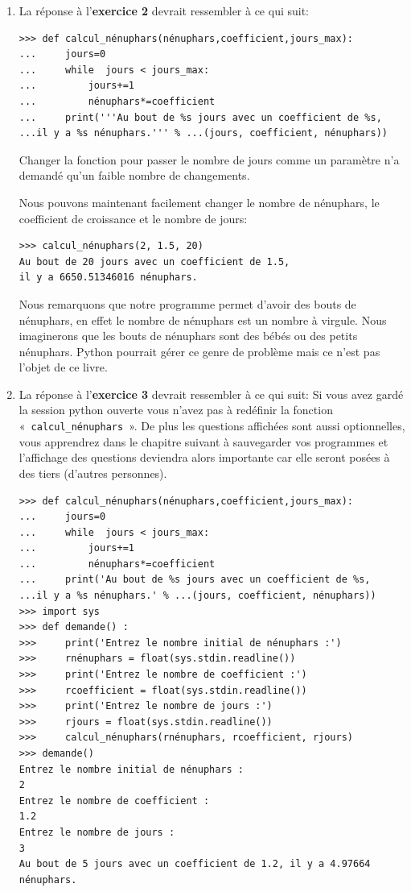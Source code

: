 \begin{enumerate}
\item La réponse à l'\textbf{exercice 2} devrait ressembler à ce qui suit: 
\begin{Verbatim}[frame=single,rulecolor=\color{mbleu}, label=à taper]
>>> def calcul_nénuphars(nénuphars,coefficient,jours_max):
...     jours=0
...     while  jours < jours_max:
...         jours+=1
...         nénuphars*=coefficient
...     print('''Au bout de %s jours avec un coefficient de %s, 
...il y a %s nénuphars.''' % ...(jours, coefficient, nénuphars))
\end{Verbatim}
Changer la fonction pour passer le nombre de jours comme un paramètre n'a demandé qu'un faible nombre de changements.

Nous pouvons maintenant facilement changer le nombre de nénuphars, le coefficient de croissance et le nombre de jours:

\begin{Verbatim}[frame=single,rulecolor=\color{mbleu}, label=à taper]
>>> calcul_nénuphars(2, 1.5, 20)
Au bout de 20 jours avec un coefficient de 1.5, 
il y a 6650.51346016 nénuphars.
\end{Verbatim}
Nous remarquons que notre programme permet d'avoir des bouts de nénuphars, en effet le nombre de nénuphars est un nombre à virgule. Nous imaginerons que les bouts de nénuphars sont des bébés ou des petits nénuphars. Python pourrait gérer ce genre de problème mais ce n'est pas l'objet de ce livre.

\item La réponse à l'\textbf{exercice 3} devrait ressembler à ce qui suit: 
Si vous avez gardé la session python ouverte vous n'avez pas à redéfinir la fonction «~\texttt{calcul\_nénuphars}~». De plus les questions affichées sont aussi optionnelles, vous apprendrez dans le chapitre suivant à sauvegarder vos programmes et l'affichage des questions deviendra alors importante car elle seront posées à des tiers (d'autres personnes).

\begin{Verbatim}[frame=single,rulecolor=\color{mbleu}, label=à taper]
>>> def calcul_nénuphars(nénuphars,coefficient,jours_max):
...     jours=0
...     while  jours < jours_max:
...         jours+=1
...         nénuphars*=coefficient
...     print('Au bout de %s jours avec un coefficient de %s, 
...il y a %s nénuphars.' % ...(jours, coefficient, nénuphars))
>>> import sys
>>> def demande() : 
>>>     print('Entrez le nombre initial de nénuphars :')
>>>     rnénuphars = float(sys.stdin.readline())
>>>     print('Entrez le nombre de coefficient :')
>>>     rcoefficient = float(sys.stdin.readline())
>>>     print('Entrez le nombre de jours :')
>>>     rjours = float(sys.stdin.readline())
>>>     calcul_nénuphars(rnénuphars, rcoefficient, rjours)
>>> demande()
Entrez le nombre initial de nénuphars :
2
Entrez le nombre de coefficient :
1.2
Entrez le nombre de jours :
3
Au bout de 5 jours avec un coefficient de 1.2, il y a 4.97664 nénuphars.\end{Verbatim}
\end{enumerate}

